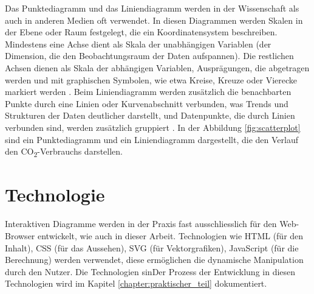 Das Punktediagramm und das Liniendiagramm werden in der Wissenschaft als auch in anderen Medien oft verwendet. In diesen Diagrammen werden Skalen in der Ebene oder Raum festgelegt, die ein Koordinatensystem beschreiben. Mindestens eine Achse dient als Skala der unabhängigen Variablen (der Dimension, die den Beobachtungsraum der Daten aufspannen). Die restlichen Achsen dienen als Skala der abhängigen Variablen, Ausprägungen, die abgetragen werden und mit graphischen Symbolen, wie etwa Kreise, Kreuze oder Vierecke markiert werden \cite{viz}. Beim Liniendiagramm werden zusätzlich die benachbarten Punkte durch eine Linien oder Kurvenabschnitt verbunden, was Trends und Strukturen der Daten deutlicher darstellt, und Datenpunkte, die durch Linien verbunden sind, werden zusätzlich gruppiert \cite{interpolation_wirkung}. In der Abbildung \ref{fig:scatterplot} sind ein Punktediagramm und ein Liniendiagramm dargestellt, die den Verlauf den CO\textsubscript{2}-Verbrauchs darstellen.

\section{Technologie}

Interaktiven Diagramme werden in der Praxis fast ausschliesslich für den Web-Browser entwickelt, wie auch in dieser Arbeit. Technologien wie HTML (für den Inhalt), CSS (für das Aussehen), SVG (für Vektorgrafiken), JavaScript (für die Berechnung) werden verwendet, diese ermöglichen die dynamische Manipulation durch den Nutzer. Die Technologien sinDer Prozess der Entwicklung in diesen Technologien wird im Kapitel \ref{chapter:praktischer_teil} dokumentiert.
